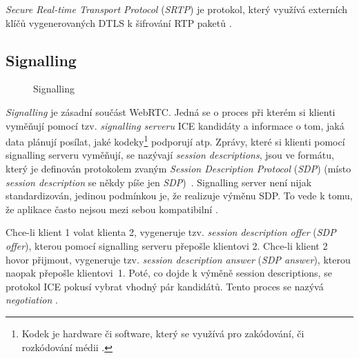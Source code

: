 \textit{Secure Real-time Transport Protocol} (\textit{SRTP}) je protokol, který
využívá externích klíčů vygenerovaných DTLS k šifrování RTP paketů
\parencite{WebRTCForTheCurious}.

\subsection{Signalling}\label{signalling}

\begin{figure}[H]
    \centering
    \caption{Signalling}
    \label{signallingServer}
\end{figure}

\textit{Signalling} je zásadní součást WebRTC. Jedná se o proces při kterém si
klienti vyměňují pomocí tzv. \textit{signalling serveru} ICE kandidáty a
informace o tom, jaká data plánují posílat, jaké kodeky\footnote{Kodek je
    hardware či software, který se využívá pro zakódování, či rozkódování médii
    \parencite{Britannica-Codec,TechTarget-Codec}.} podporují atp. Zprávy, které si
klienti pomocí signalling serveru vyměňují, se nazývají \textit{session
    descriptions}, jsou ve formátu, který je definován protokolem zvaným
\textit{Session Description Protocol} (\textit{SDP}) (místo \textit{session
    description} se někdy píše jen \textit{SDP})~\parencite{WebRTCForTheCurious}.
Signalling server není nijak standardizován, jedinou podmínkou je, že realizuje
výměnu SDP. To vede k tomu, že aplikace často nejsou mezi sebou kompatibilní
\parencite{MDN-Web-SignalingAndVideoCalling}.

Chce-li klient 1 volat klienta 2, vygeneruje tzv. \textit{session description
    offer} (\textit{SDP offer}), kterou pomocí signalling serveru přepošle klientovi
2. Chce-li klient 2 hovor přijmout, vygeneruje tzv. \textit{session description
    answer} (\textit{SDP answer}), kterou naopak přepošle klientovi~1. Poté, co
dojde k výměně session descriptions, se protokol ICE pokusí vybrat vhodný pár
kandidátů. Tento proces se nazývá \textit{negotiation}
\parencite{WebRTCForTheCurious,MozillaBlog-PerfectNegotiation}.

